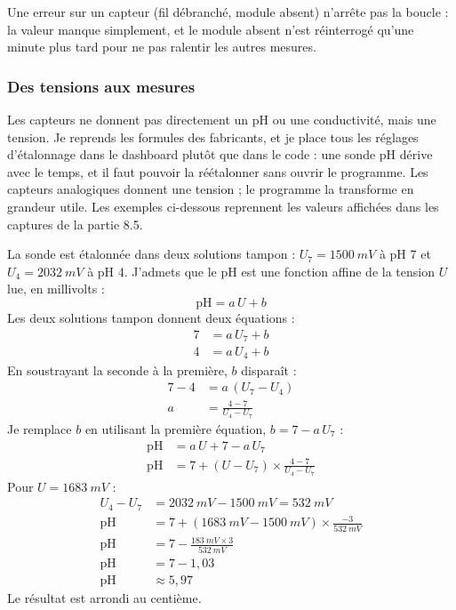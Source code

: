 Une erreur sur un capteur (fil débranché, module absent) n'arrête pas la boucle : la valeur manque simplement, et le module absent n'est réinterrogé qu'une minute plus tard pour ne pas ralentir les autres mesures.

\subsubsection*{Des tensions aux mesures}

Les capteurs ne donnent pas directement un pH ou une conductivité, mais une tension. Je reprends les formules des fabricants, et je place tous les réglages d'étalonnage dans le dashboard plutôt que dans le code : une sonde pH dérive avec le temps, et il faut pouvoir la réétalonner sans ouvrir le programme. Les capteurs analogiques donnent une tension ; le programme la transforme en grandeur utile. Les exemples ci-dessous reprennent les valeurs affichées dans les captures de la partie 8.5.

\begin{demonstration}
La sonde est étalonnée dans deux solutions tampon : $U_7 = \qty{1500}{mV}$ à pH 7 et $U_4 = \qty{2032}{mV}$ à pH 4. J'admets que le pH est une fonction affine de la tension $U$ lue, en millivolts :
\[
\mathrm{pH} = a\,U + b
\]
Les deux solutions tampon donnent deux équations :
\begin{align*}
7 &= a\,U_7 + b\\
4 &= a\,U_4 + b
\end{align*}
En soustrayant la seconde à la première, $b$ disparaît :
\begin{align*}
7 - 4 &= a\,(U_7 - U_4)\\
a &= \frac{4-7}{U_4 - U_7}
\end{align*}
Je remplace $b$ en utilisant la première équation, $b = 7 - a\,U_7$ :
\begin{align*}
\mathrm{pH} &= a\,U + 7 - a\,U_7\\
\mathrm{pH} &= 7 + (U - U_7)\times\frac{4-7}{U_4 - U_7}
\end{align*}
Pour $U = \qty{1683}{mV}$ :
\begin{align*}
U_4 - U_7 &= \qty{2032}{mV} - \qty{1500}{mV} = \qty{532}{mV}\\
\mathrm{pH} &= 7 + (\qty{1683}{mV} - \qty{1500}{mV})\times\frac{-3}{\qty{532}{mV}}\\
\mathrm{pH} &= 7 - \frac{\qty{183}{mV}\times 3}{\qty{532}{mV}}\\
\mathrm{pH} &= 7 - 1{,}03\\
\mathrm{pH} &\approx 5{,}97
\end{align*}
Le résultat est arrondi au centième.
\end{demonstration}

